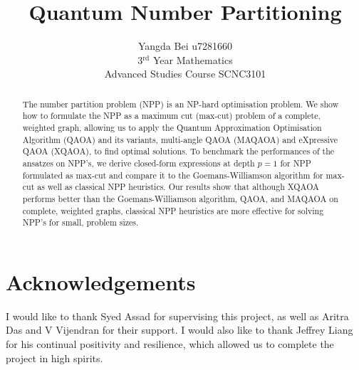 \documentclass[aps,twocolumn,preprintnumbers]{revtex4}
\begin{document}
\title{Quantum Number Partitioning}
\author{Yangda Bei u7281660 \\ 3$^\text{rd}$ Year Mathematics \\ Advanced Studies Course SCNC3101}




    \begin{abstract}
    \centering

        The number partition problem (NPP) is an NP-hard optimisation problem. We show how to formulate the NPP as a maximum cut (max-cut) problem of a complete, weighted graph, allowing us to apply the Quantum Approximation Optimisation Algorithm (QAOA) and its variants, multi-angle QAOA (MAQAOA) and eXpressive QAOA (XQAOA), to find optimal solutions. To benchmark the performances of the ansatzes on NPP's, we derive closed-form expressions at depth $p=1$ for NPP formulated as max-cut and compare it to the Goemans-Williamson algorithm for max-cut as well as classical NPP heuristics. Our results show that although XQAOA performs better than the Goemans-Williamson algorithm, QAOA, and MAQAOA on complete, weighted graphs, classical NPP heuristics are more effective for solving NPP's for small, problem sizes.
    \end{abstract}

\maketitle 


    

    
    
    
    

    

    

    

    

    \section*{Acknowledgements}

    I would like to thank Syed Assad for supervising this project, as well as Aritra Das and V Vijendran for their support. I would also like to thank Jeffrey Liang for his continual positivity and resilience, which allowed us to complete the project in high spirits.

    
    
\end{document}
